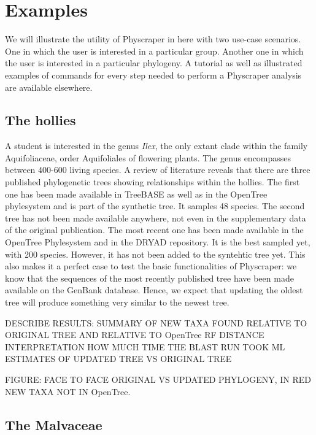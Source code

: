 \documentclass[]{article}
\begin{document}
\hypertarget{examples}{%
\section{Examples}\label{examples}}

We will illustrate the utility of Physcraper in here with two use-case scenarios. One in which the user is interested in a particular group. Another one in which the user is interested in a particular phylogeny.
A tutorial as well as illustrated examples of commands for every step needed to perform a Physcraper analysis are available elsewhere.

\hypertarget{the-hollies}{%
\subsection{The hollies}\label{the-hollies}}

A student is interested in the genus \emph{Ilex}, the only extant clade within the family Aquifoliaceae, order Aquifoliales of flowering plants.
The genus encompasses between 400-600 living species. A review of literature reveals that there are three published phylogenetic trees showing relationships within the hollies.
The first one has been made available in TreeBASE as well as in the OpenTree phylesystem and is part of the synthetic tree. It samples 48 species.
The second tree has not been made available anywhere, not even in the supplementary data of the original publication.
The most recent one has been made available in the OpenTree Phylesystem and in the DRYAD repository. It is the best sampled yet, with 200 species. However, it has not been added to the syntehtic tree yet.
This also makes it a perfect case to test the basic functionalities of Physcraper: we know that the sequences of the most recently published tree have been made available on the GenBank database. Hence, we expect that updating the oldest tree will produce something very similar to the newest tree.

DESCRIBE RESULTS: SUMMARY OF NEW TAXA FOUND RELATIVE TO ORIGINAL TREE AND RELATIVE TO OpenTree
RF DISTANCE INTERPRETATION
HOW MUCH TIME THE BLAST RUN TOOK
ML ESTIMATES OF UPDATED TREE VS ORIGINAL TREE

FIGURE: FACE TO FACE ORIGINAL VS UPDATED PHYLOGENY, IN RED NEW TAXA NOT IN OpenTree.

\hypertarget{the-malvaceae}{%
\subsection{The Malvaceae}\label{the-malvaceae}}
\end{document}
